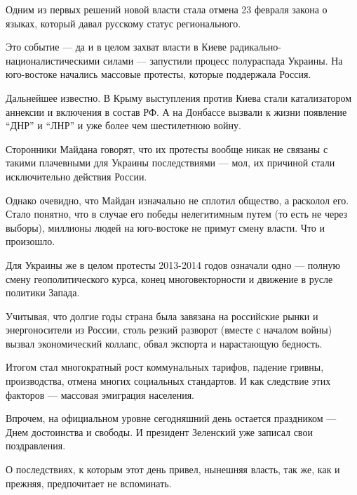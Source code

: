 Одним из первых решений новой власти стала отмена 23 февраля закона о
языках, который давал русскому статус регионального. 

Это событие --- да и в целом захват власти в Киеве
радикально-националистическими силами ---  запустили процесс полураспада
Украины. На юго-востоке начались массовые протесты, которые поддержала
Россия. 

Дальнейшее известно. В Крыму выступления против Киева стали катализатором
аннексии и включения в состав РФ. А на Донбассе вызвали к жизни появление
\enquote{ДНР} и \enquote{ЛНР} и уже более чем шестилетнюю войну.

Сторонники Майдана говорят, что их протесты вообще никак не связаны с
такими плачевными для Украины последствиями --- мол, их причиной стали
исключительно действия России. 

Однако очевидно, что Майдан изначально не сплотил общество, а расколол
его. Стало понятно, что в случае его победы нелегитимным путем (то есть не
через выборы), миллионы людей на юго-востоке не примут смену власти. Что и
произошло. 

Для Украины же в целом протесты 2013-2014 годов означали одно --- полную
смену геополитического курса, конец многовекторности и движение в русле
политики Запада.

Учитывая, что долгие годы страна была завязана на российские рынки и
энергоносители из России, столь резкий разворот (вместе с началом войны)
вызвал экономический коллапс, обвал экспорта и нарастающую бедность.  

Итогом стал многократный рост коммунальных тарифов, падение гривны,
производства, отмена многих социальных стандартов. И как следствие этих
факторов --- массовая эмиграция населения. 

Впрочем, на официальном уровне сегодняшний день остается праздником --- Днем
достоинства и свободы. И президент Зеленский уже записал свои
поздравления. 

О последствиях, к которым этот день привел, нынешняя власть, так же, как и
прежняя, предпочитает не вспоминать.

